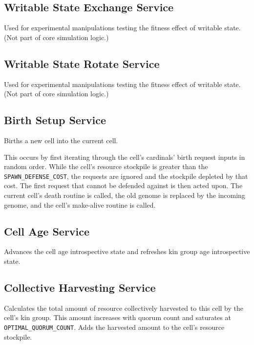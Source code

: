 \subsection{Writable State Exchange Service}


Used for experimental manipulations testing the fitness effect of writable state.
(Not part of core simulation logic.)

\subsection{Writable State Rotate Service}


Used for experimental manipulations testing the fitness effect of writable state.
(Not part of core simulation logic.)

\subsection{Birth Setup Service}


Births a new cell into the current cell.

This occurs by first iterating through the cell's cardinals' birth request inputs in random order.
While the cell's resource stockpile is greater than the \texttt{SPAWN\_DEFENSE\_COST}, the requests are ignored and the stockpile depleted by that cost.
The first request that cannot be defended against is then acted upon.
The current cell's death routine is called, the old genome is replaced by the incoming genome, and the cell's make-alive routine is called.

\subsection{Cell Age Service}


Advances the cell age introspective state and refreshes kin group age introspective state.

\subsection{Collective Harvesting Service}


Calculates the total amount of resource collectively harvested to this cell by the cell's kin group.
This amount increases with quorum count and saturates at \texttt{OPTIMAL\_QUORUM\_COUNT}. 
Adds the harvested amount to the cell's resource stockpile.

